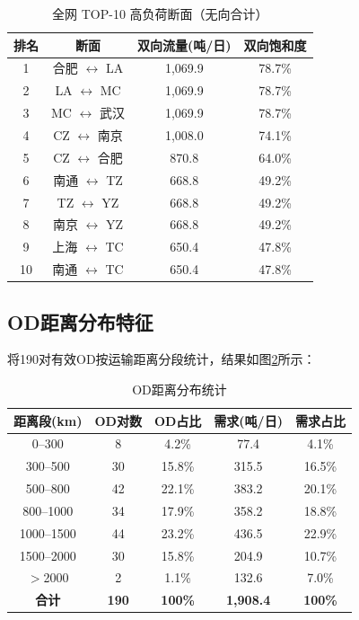 \documentclass[12pt,a4paper,fontset=none]{ctexart}
\begin{document}
\begin{table}[H]
\centering
\caption{全网 TOP-10 高负荷断面（无向合计）}
\label{tab:undirected}
\begin{tabular}{cccc}
\toprule
\textbf{排名} & \textbf{断面} & \textbf{双向流量(吨/日)} & \textbf{双向饱和度} \\
\midrule
1 & 合肥 $\leftrightarrow$ LA     & 1,069.9 & 78.7\% \\
2 & LA $\leftrightarrow$ MC       & 1,069.9 & 78.7\% \\
3 & MC $\leftrightarrow$ 武汉     & 1,069.9 & 78.7\% \\
4 & CZ $\leftrightarrow$ 南京     & 1,008.0 & 74.1\% \\
5 & CZ $\leftrightarrow$ 合肥     & 870.8   & 64.0\% \\
6 & 南通 $\leftrightarrow$ TZ     & 668.8   & 49.2\% \\
7 & TZ $\leftrightarrow$ YZ       & 668.8   & 49.2\% \\
8 & 南京 $\leftrightarrow$ YZ     & 668.8   & 49.2\% \\
9 & 上海 $\leftrightarrow$ TC     & 650.4   & 47.8\% \\
10& 南通 $\leftrightarrow$ TC     & 650.4   & 47.8\% \\
\bottomrule
\end{tabular}
\end{table}

\subsection{OD距离分布特征}

将190对有效OD按运输距离分段统计，结果如图\ref{tab:dist_dist}所示：

\begin{table}[H]
\centering
\caption{OD距离分布统计}
\label{tab:dist_dist}
\begin{tabular}{ccccc}
\toprule
\textbf{距离段(km)} & \textbf{OD对数} & \textbf{OD占比} & \textbf{需求(吨/日)} & \textbf{需求占比} \\
\midrule
0--300    &  8  &  4.2\% &  77.4  &  4.1\% \\
300--500  & 30  & 15.8\% & 315.5  & 16.5\% \\
500--800  & 42  & 22.1\% & 383.2  & 20.1\% \\
800--1000 & 34  & 17.9\% & 358.2  & 18.8\% \\
1000--1500& 44  & 23.2\% & 436.5  & 22.9\% \\
1500--2000& 30  & 15.8\% & 204.9  & 10.7\% \\
$>$2000  &  2  &  1.1\% & 132.6  &  7.0\% \\
\midrule
\textbf{合计} & \textbf{190} & \textbf{100\%} & \textbf{1,908.4} & \textbf{100\%} \\
\bottomrule
\end{tabular}
\end{table}
\end{document}
